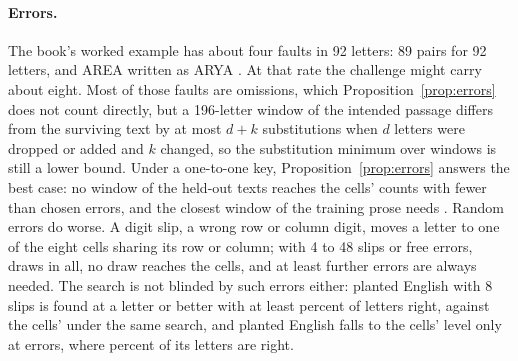 \documentclass[11pt]{article}
\theoremstyle{definition}
\begin{document}
\paragraph{Errors.} The book's worked example has about four faults in 92 letters: 89 pairs for 92 letters, and AREA written as ARYA \cite{wikipedia2026}. At that rate the challenge might carry about eight. Most of those faults are omissions, which Proposition~\ref{prop:errors} does not count directly, but a 196-letter window of the intended passage differs from the surviving text by at most $d + k$ substitutions when $d$ letters were dropped or added and $k$ changed, so the substitution minimum over windows is still a lower bound. Under a one-to-one key, Proposition~\ref{prop:errors} answers the best case: no window of the held-out texts reaches the cells' counts with fewer than \errBestFewest{} chosen errors, and the closest window of the training prose needs \corpusClosestDistance{}. Random errors do worse. A digit slip, a wrong row or column digit, moves a letter to one of the eight cells sharing its row or column; with 4 to 48 slips or free errors, \errRandomDraws{} draws in all, no draw reaches the cells, and at least \errRandomFewest{} further errors are always needed. The search is not blinded by such errors either: planted English with 8 slips is found at \errEightLow{} a letter or better with at least \errEightRight{} percent of letters right, against the cells' \errCells{} under the same search, and planted English falls to the cells' level only at \errLevel{} errors, where \errLevelRight{} percent of its letters are right.
\end{document}
